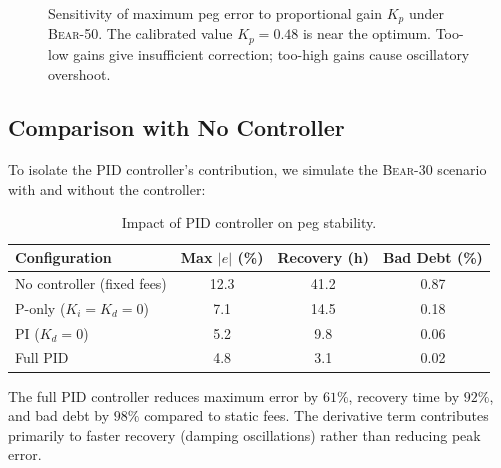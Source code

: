 \documentclass[11pt,a4paper]{article}
\begin{document}
\begin{figure}[H]
\centering
{}
\caption{Sensitivity of maximum peg error to proportional gain $K_p$ under \textsc{Bear-50}. The calibrated value $K_p = 0.48$ is near the optimum. Too-low gains give insufficient correction; too-high gains cause oscillatory overshoot.}
\label{fig:sensitivity}
\end{figure}

\subsection{Comparison with No Controller}

To isolate the PID controller's contribution, we simulate the \textsc{Bear-30} scenario with and without the controller:

\begin{table}[H]
\centering
\caption{Impact of PID controller on peg stability.}
\label{tab:controller_comparison}
\begin{tabular}{@{}lccc@{}}
\toprule
\textbf{Configuration} & \textbf{Max $|e|$ (\%)} & \textbf{Recovery (h)} & \textbf{Bad Debt (\%)} \\
\midrule
No controller (fixed fees)     & 12.3 & 41.2 & 0.87 \\
P-only ($K_i = K_d = 0$)       & 7.1  & 14.5 & 0.18 \\
PI ($K_d = 0$)                  & 5.2  & 9.8  & 0.06 \\
Full PID                        & 4.8  & 3.1  & 0.02 \\
\bottomrule
\end{tabular}
\end{table}

The full PID controller reduces maximum error by $61\%$, recovery time by $92\%$, and bad debt by $98\%$ compared to static fees.
The derivative term contributes primarily to faster recovery (damping oscillations) rather than reducing peak error.
\end{document}
